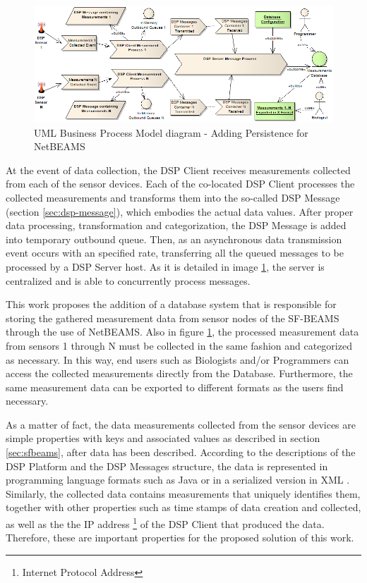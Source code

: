 \begin{figure}[!b]
  \centering
  \includegraphics[scale=0.5]{../diagrams/DSP-DataPersistence-Business-Diagram}
  \caption{UML Business Process Model diagram - Adding Persistence for NetBEAMS}
  \label{fig:dsp-persistence-business-process}
\end{figure}

At the event of data collection, the DSP Client receives measurements collected
from each of the sensor devices. Each of the co-located DSP Client processes
the collected measurements and transforms them into the so-called DSP Message
(section \ref{sec:dsp-message}), which embodies the actual data values. After
proper data processing, transformation and categorization, the DSP Message is
added into temporary outbound queue. Then, as an asynchronous data
transmission event occurs with an specified rate, transferring all the queued
messages to be processed by a DSP Server host. As it is detailed in image
\ref{fig:dsp-persistence-business-process}, the server is centralized and is
able to concurrently process messages.

This work proposes the addition of a database system that is responsible for
storing the gathered measurement data from sensor nodes of the SF-BEAMS through
the use of NetBEAMS. Also in figure \ref{fig:dsp-persistence-business-process}, 
the processed measurement data from sensors 1 through N must be collected in
the same fashion and categorized as necessary. In this way, end users such as
Biologists and/or Programmers can access the collected measurements directly
from the Database. Furthermore, the same measurement data can be exported to
different formats as the users find necessary.

As a matter of fact, the data measurements collected from the sensor devices
are simple properties with keys and associated values as described in section
\ref{sec:sfbeams}, after data has been described. According to the descriptions
of the DSP Platform and the DSP Messages structure, the data is represented in
programming language formats such as Java \cite{java} or in a serialized
version in XML \cite{xml}. Similarly, the collected data contains measurements
that uniquely identifies them, together with other properties such as time
stamps of data creation and collected, as well as the the IP address
\footnote{Internet Protocol Address} of the DSP Client that produced the data.
Therefore, these are important properties for the proposed solution of this work.

